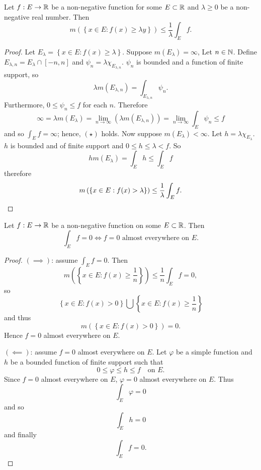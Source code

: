 
\begin{proposition}[]
	Let $f: E \to \mathbb{R}$ be a non-negative function for some $E \subset \mathbb{R}$
	and $\lambda \geq 0$ be a non-negative real number.
	Then
	\[
		m\left( 
			\left\{
				x \in E: f(x) \geq \lambda y
			\right\} 
		\right)
		\leq
		\frac{1}{\lambda}
		\int_E f. \tag{$\star$}
	\]
\end{proposition}

\begin{proof}
	Let
	$
		E_\lambda =
		\left\{
			x \in E:
			f(x) \geq \lambda
		\right\}
	$.
	Suppose $m(E_\lambda) = \infty$,
	Let $n \in \mathbb{N}$. 
	Define
	$
		E_{\lambda,n} = E_\lambda \cap [-n,n]
	$
	and
	$
	\psi_n = \lambda \chi_{E_{\lambda,n}}
	$.
	$\psi_n$ is bounded and a function of finite support,
	so
	\[
		\lambda m \left( E_{\lambda, n} \right)
		= \int_{E_{\lambda,n}} \psi_n.
	\]
	Furthermore, $0 \leq \psi_n \leq f$
	for each $n$. 
	Therefore
	\[
		\infty 
		= \lambda m \left( E_{\lambda} \right)
		= \lim_{n \to \infty} \left( 
			\lambda m \left( E_{\lambda, n} \right) 
		\right)
		= \lim_{n \to \infty} \int_E \psi_n
		\leq f
	\]
	and so $\int_E f = \infty$; hence, $(\star)$ holds.
	Now suppose $m(E_\lambda) < \infty$.
	Let $h = \lambda \chi_{E_\lambda}$.
	$h$ is bounded and of finite support and
	$0 \leq h \leq \lambda < f$.
	So
	\[
		h m \left( E_\lambda \right) = \int_E h \leq \int_E f
	\]
	therefore
	\[
		m \left( 
			\left\{
				x \in E: f(x) > \lambda
			\right\} 
		\right)
		\leq
		\frac{1}{\lambda} \int_E f. \qedhere
	\]
\end{proof}

\begin{proposition}[]
	Let $f: E \to \mathbb{R}$ be a non-negative function on some $E \subset \mathbb{R}$.
	Then
	\[
		\int_E f = 0 \iff \text{$f = 0$ almost everywhere on $E$}.
	\]
\end{proposition}

\begin{proof}
	$(\implies)$: assume $\int_E f = 0$.
	Then
	\[
		m\left( 
			\left\{
				x \in E: f(x) \geq \frac1n
			\right\} 
		\right)
		\leq \frac1n \int_E f = 0,
	\]
	so
	\[
		\left\{
			x \in E: f(x) > 0
		\right\}
		\bigcup
		\left\{
			x \in E: f(x) \geq \frac1n
		\right\}
	\]
	and thus
	\[
		m \left( 
			\left\{
				x \in E: f(x) > 0
			\right\} 
		\right)
		= 0.
	\]
	Hence $f = 0$ almost everywhere on $E$.
	
	$(\impliedby)$: assume $f = 0$ almost everywhere on $E$.
	Let $\varphi$ be a simple function
	and $h$ be a bounded function of finite support such that
	\[
		0 \leq \varphi \leq h \leq f \quad\text{on $E$}.
	\]
	Since $f = 0$ almost everywhere on $E$,
	$\varphi = 0$ almost everywhere on $E$.
	Thus
	\[
		\int_E \varphi = 0
	\]
	and so
	\[
		\int_E h = 0
	\]
	and finally
	\[
		\int_E f = 0.
	\]
\end{proof}

